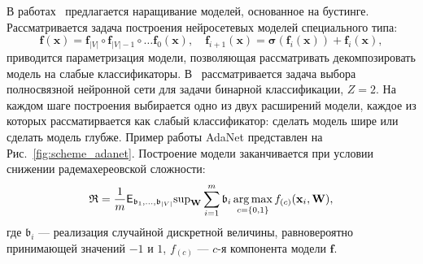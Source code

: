 В работах~\cite{boost_res,adanet} предлагается наращивание моделей, основанное на бустинге. Рассматривается задача построения нейросетевых моделей специального типа:
\[
    \mathbf{f}(\mathbf{x}) = \mathbf{f}_{|V|} \circ \mathbf{f}_{|V|-1} \circ \dots \mathbf{f}_0(\mathbf{x}), \quad  \mathbf{f}_{i+1}(\mathbf{x}) = \boldsymbol{\sigma}\left(\mathbf{f}_i(\mathbf{x})\right) + \mathbf{f}_i(\mathbf{x}),
\]
приводится параметризация модели, позволяющая рассматривать декомпозировать модель на слабые классификаторы.
В~\cite{adanet} рассматривается задача выбора полносвязной нейронной сети для задачи бинарной классификации, $Z=2$. На каждом шаге построения выбирается одно из двух расширений модели, каждое из которых рассматирвается как слабый классификатор: сделать модель шире или сделать модель глубже. Пример работы AdaNet представлен на Рис.~\ref{fig:scheme_adanet}.
Построение модели заканчивается при условии снижении радемахереовской сложности:
\[
    \mathfrak{R} = \frac{1}{m}\mathsf{E}_{\mathfrak{b}_1,\dots, \mathfrak{b}_{|V|}} \text{sup}_{\mathbf{W}} \sum_{i=1}^m \mathfrak{b}_i \operatorname*{arg\,max}_{c = \{0,1\}}f_{(c)}(\mathbf{x}_i, \mathbf{W}),
\]
где $\mathfrak{b}_i$ --- реализация случайной дискретной величины, равновероятно принимающей значений $-1$ и $1$, $f_{(c)}$ --- $c$-я компонента модели $\mathbf{f}$.

